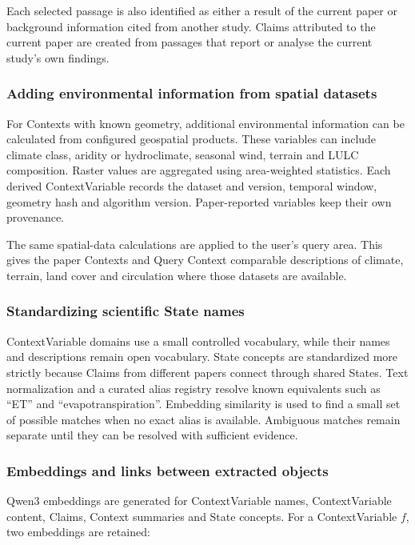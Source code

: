 \documentclass[10pt,twocolumn]{article}
\begin{document}
Each selected passage is also identified as either a result of the current paper or background information cited from another study. Claims attributed to the current paper are created from passages that report or analyse the current study's own findings.

\subsubsection{Adding environmental information from spatial datasets}

For Contexts with known geometry, additional environmental information can be calculated from configured geospatial products. These variables can include climate class, aridity or hydroclimate, seasonal wind, terrain and LULC composition. Raster values are aggregated using area-weighted statistics. Each derived ContextVariable records the dataset and version, temporal window, geometry hash and algorithm version. Paper-reported variables keep their own provenance.

The same spatial-data calculations are applied to the user's query area. This gives the paper Contexts and Query Context comparable descriptions of climate, terrain, land cover and circulation where those datasets are available.

\subsubsection{Standardizing scientific State names}

ContextVariable domains use a small controlled vocabulary, while their names and descriptions remain open vocabulary. State concepts are standardized more strictly because Claims from different papers connect through shared States. Text normalization and a curated alias registry resolve known equivalents such as ``ET'' and ``evapotranspiration''. Embedding similarity is used to find a small set of possible matches when no exact alias is available. Ambiguous matches remain separate until they can be resolved with sufficient evidence.

\subsubsection{Embeddings and links between extracted objects}

Qwen3 embeddings are generated for ContextVariable names, ContextVariable content, Claims, Context summaries and State concepts. For a ContextVariable $f$, two embeddings are retained:
\end{document}
